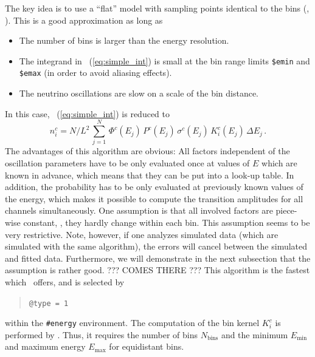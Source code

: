 The key idea is to use a ``flat'' model with sampling points identical to 
the bins (\cf, ). This is a good approximation as long as
\begin{itemize}
\item
 The number of bins is larger than the energy resolution.
\item
 The integrand in \eq~(\ref{eq:simple_int}) is small at the bin range limits
{\tt \$emin} and {\tt \$emax} (in order to avoid aliasing effects).
\item
 The neutrino oscillations are slow on a scale of the bin distance.
\end{itemize}
In this case, \eq~(\ref{eq:simple_int}) is reduced to
\begin{equation}
\label{eq:algo_one}
n_i^c=N/L^2 \, \sum_{j=1}^N \,  \Phi^c(E_j)\,
P^c(E_j)\,
\sigma^c(E_j)\,
K_i^c(E_j) \, \Delta E_j \,.
\end{equation}
The advantages of this algorithm are obvious: All factors
independent of the oscillation parameters have to be only evaluated once
at values of $E$ which are known in advance, which means that they can be put 
into a look-up table. In addition, the probability
has to be only evaluated at previously known values of the energy, which
makes it possible to compute the transition amplitudes for all channels
simultaneously. One assumption is that all involved factors are piece-wise
constant, \ie, they hardly change within each bin. This 
assumption seems to be very restrictive. Note, however, if one analyzes simulated data (which are simulated with the same algorithm), the errors
will cancel between the simulated and fitted data. 
%
Furthermore, we will demonstrate in the next subsection that the assumption
is rather good. ??? COMES THERE ???
%
This algorithm is the fastest which \GLOBES\ offers, and is selected by
%
%
\begin{quote}
{\tt \tb @type = 1}
\end{quote}
within the {\tt \#energy} environment.
The computation of the bin kernel $K_i^c$ is performed
by \GLOBES. Thus, it requires  the number of bins
 $N_\mathrm{bins}$
and the minimum $E_\mathrm{min}$ and maximum energy $E_\mathrm{max}$
for equidistant bins.
 
